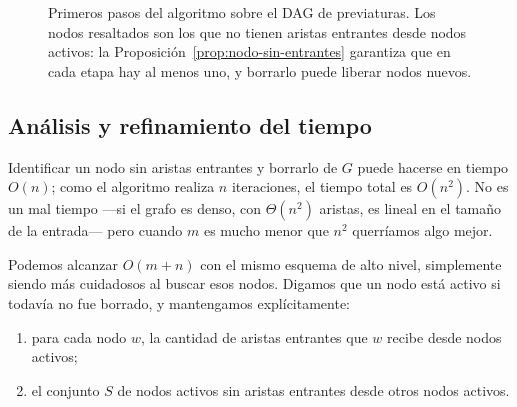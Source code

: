 \documentclass[12pt, spanish, oneside, openany]{book}
\theoremstyle{uprightplain}
\theoremstyle{definition}
\theoremstyle{remark}
\theoremstyle{definition}
\begin{document}
\begin{figure}[H]
\caption{Primeros pasos del algoritmo sobre el DAG de previaturas. Los nodos
resaltados son los que no tienen aristas entrantes desde nodos activos: la
Proposición~\ref{prop:nodo-sin-entrantes} garantiza que en cada etapa hay al
menos uno, y borrarlo puede liberar nodos nuevos.}
\label{fig:dag-borrado}
\end{figure}

\subsection{Análisis y refinamiento del tiempo}

Identificar un nodo sin aristas entrantes y borrarlo de $G$ puede hacerse en tiempo $O(n)$; como el algoritmo realiza $n$ iteraciones, el tiempo total es $O(n^2)$. No es un mal tiempo ---si el grafo es denso, con $\Theta(n^2)$ aristas, es lineal en el tamaño de la entrada--- pero cuando $m$ es mucho menor que $n^2$ querríamos algo mejor.

Podemos alcanzar $O(m+n)$ con el mismo esquema de alto nivel, simplemente siendo más cuidadosos al buscar esos nodos. Digamos que un nodo está activo si todavía no fue borrado, y mantengamos explícitamente:

\begin{enumerate}[label=(\alph*)]
    \item para cada nodo $w$, la cantidad de aristas entrantes que $w$ recibe desde nodos activos;
    \item el conjunto $S$ de nodos activos sin aristas entrantes desde otros nodos activos.
\end{enumerate}
\end{document}
